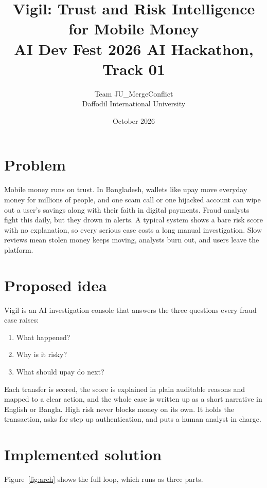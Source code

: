 \documentclass[11pt,a4paper]{article}
\title{Vigil: Trust and Risk Intelligence for Mobile Money\\{\large AI Dev Fest 2026 AI Hackathon, Track 01}}
\author{Team JU\_MergeConflict\\Daffodil International University}
\date{October 2026}
\begin{document}
\maketitle

\section{Problem}

Mobile money runs on trust. In Bangladesh, wallets like upay move everyday
money for millions of people, and one scam call or one hijacked account can
wipe out a user's savings along with their faith in digital payments. Fraud
analysts fight this daily, but they drown in alerts. A typical system shows a
bare risk score with no explanation, so every serious case costs a long manual
investigation. Slow reviews mean stolen money keeps moving, analysts burn out,
and users leave the platform.

\section{Proposed idea}

Vigil is an AI investigation console that answers the three questions every
fraud case raises:
\begin{enumerate}[nosep]
  \item What happened?
  \item Why is it risky?
  \item What should upay do next?
\end{enumerate}
Each transfer is scored, the score is explained in plain auditable reasons and
mapped to a clear action, and the whole case is written up as a short
narrative in English or Bangla. High risk never blocks money on its own. It
holds the transaction, asks for step up authentication, and puts a human
analyst in charge.

\section{Implemented solution}

Figure~\ref{fig:arch} shows the full loop, which runs as three parts.
\end{document}
